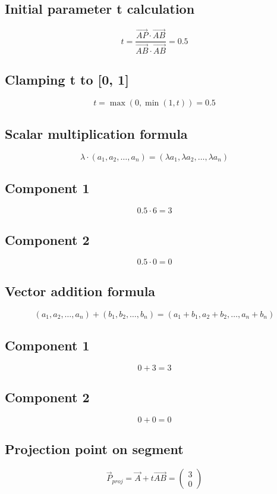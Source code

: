 \documentclass{article}
\begin{document}
\subsection*{ \vspace{1em} Initial parameter t calculation}
\[
t = \frac{\vec{AP} \cdot \vec{AB}}{\vec{AB} \cdot \vec{AB}} = 0.5
\]
\subsection*{ \vspace{1em} Clamping t to [0, 1]}
\[
t = \max(0, \min(1, t)) = 0.5
\]
\subsection*{ \vspace{1em} Scalar multiplication formula}
\[
\lambda \cdot (a_1, a_2, \dots, a_n) = (\lambda a_1, \lambda a_2, \dots, \lambda a_n)
\]
\subsection*{ \vspace{1em} Component 1}
\[
0.5 \cdot 6 = 3
\]
\subsection*{ \vspace{1em} Component 2}
\[
0.5 \cdot 0 = 0
\]
\subsection*{ \vspace{1em} Vector addition formula}
\[
(a_1, a_2, \dots, a_n) + (b_1, b_2, \dots, b_n) = (a_1 + b_1, a_2 + b_2, \dots, a_n + b_n)
\]
\subsection*{ \vspace{1em} Component 1}
\[
0 + 3 = 3
\]
\subsection*{ \vspace{1em} Component 2}
\[
0 + 0 = 0
\]
\subsection*{ \vspace{1em} Projection point on segment}
\[
\vec{P}_{proj} = \vec{A} + t \vec{AB} = \begin{pmatrix}3 \\ 0\end{pmatrix}
\]
\end{document}
